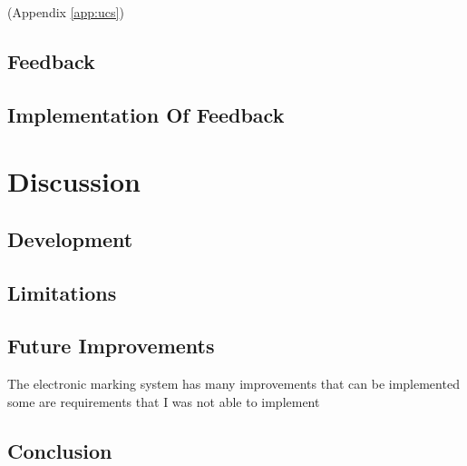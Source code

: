 \documentclass[12pt]{article}  %
\begin{document}
(Appendix \ref{app:ucs})

\subsection{Feedback}
\subsection{Implementation Of Feedback}

\newpage
\section{Discussion}

\subsection{Development}

\subsection{Limitations}

\subsection{Future Improvements}
The electronic marking system has many improvements that can be implemented some are requirements that I was not able to implement 

\subsection{Conclusion}







\newpage
\printbibliography[heading=bibintoc]
\let\cleardoublepage\clearpage


\end{document}
